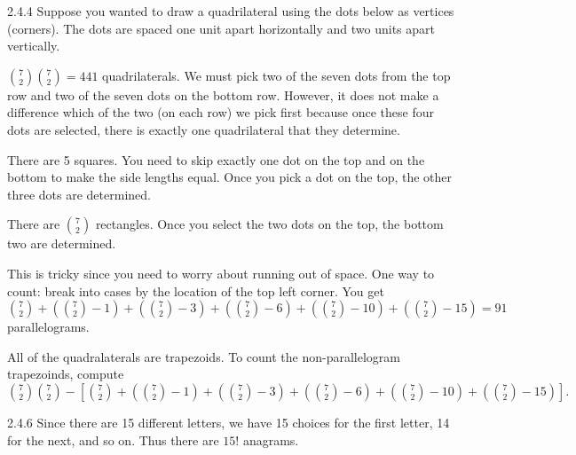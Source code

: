 \documentclass[11pt,]{book}
\theoremstyle{ptxplainnotitle}
\theoremstyle{ptxplaintitle}
\theoremstyle{ptxdefinitionnotitle}
\theoremstyle{ptxdefinitiontitle}
\theoremstyle{ptxdefinitionnotitle}
\theoremstyle{ptxdefinitiontitle}
\theoremstyle{ptxdefinitionnotitle}
\theoremstyle{ptxdefinitiontitle}
\theoremstyle{ptxdefinitiontitlenonumber}
\theoremstyle{ptxdefinitiontitlenonumber}
\numberwithin{equation}{chapter}
\begin{document}
\begin{divisionexercise}{2.4.4}
\hypertarget{p-1547}{}%
Suppose you wanted to draw a quadrilateral using the dots below as vertices (corners).  The dots are spaced one unit apart horizontally and two units apart vertically.%
\begin{sidebyside}{1}{0.23}{0.23}{0}
\begin{sbspanel}{0.54}
\end{sbspanel}
\end{sidebyside}
\par\medskip
\textbf{}\hypertarget{p-1577}{}%
\({7\choose 2}{7\choose 2} = 441\) quadrilaterals. We must pick two of the seven dots from the top row and two of the seven dots on the bottom row. However, it does not make a difference which of the two (on each row) we pick first because once these four dots are selected, there is exactly one quadrilateral that they determine.%
\par
\hypertarget{p-1578}{}%
There are 5 squares. You need to skip exactly one dot on the top and on the bottom to make the side lengths equal. Once you pick a dot on the top, the other three dots are determined.%
\par
\hypertarget{p-1579}{}%
There are \({7 \choose 2}\) rectangles. Once you select the two dots on the top, the bottom two are determined.%
\par
\hypertarget{p-1580}{}%
This is tricky since you need to worry about running out of space. One way to count: break into cases by the location of the top left corner. You get \({7 \choose 2} + ({7 \choose 2}-1) + ({7 \choose 2} - 3) + ({7 \choose 2} - 6) + ({7 \choose 2} - 10) + ({7 \choose 2} - 15) = 91\) parallelograms.%
\par
\hypertarget{p-1581}{}%
All of the quadralaterals are trapezoids.  To count the non-parallelogram trapezoinds, compute \({7\choose 2}{7\choose 2} - \left[ {7 \choose 2} + ({7 \choose 2}-1) + ({7 \choose 2} - 3) + ({7 \choose 2} - 6) + ({7 \choose 2} - 10) + ({7 \choose 2} - 15) \right]\text{.}\)%
\end{divisionexercise}%
\begin{divisionexercise}{2.4.6}
\textbf{}\hypertarget{p-1589}{}%
Since there are 15 different letters, we have 15 choices for the first letter, 14 for the next, and so on. Thus there are \(15!\) anagrams.%
\end{divisionexercise}%
\end{document}
